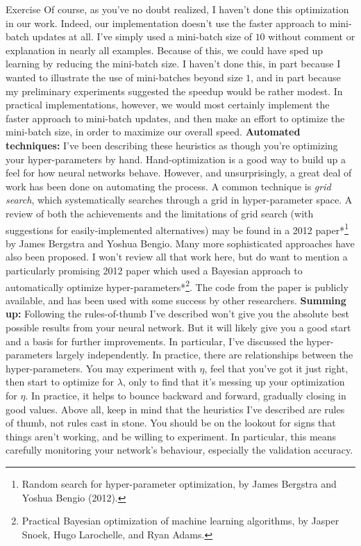 \begin{exerciseBox}{Exercise}
Of course, as you've no doubt realized, I haven't done this optimization in our work. Indeed, our implementation doesn't use the faster approach to mini-batch updates at all. I've simply used a mini-batch size of $10$ without comment or explanation in nearly all examples. Because of this, we could have sped up learning by reducing the mini-batch size. I haven't done this, in part because I wanted to illustrate the use of mini-batches beyond size $1$, and in part because my preliminary experiments suggested the speedup would be rather modest. In practical implementations, however, we would most certainly implement the faster approach to mini-batch updates, and then make an effort to optimize the mini-batch size, in order to maximize our overall speed. \textbf{Automated techniques:} I've been describing these heuristics as though you're optimizing your hyper-parameters by hand. Hand-optimization is a good way to build up a feel for how neural networks behave. However, and unsurprisingly, a great deal of work has been done on automating the process. A common technique is \emph{grid search}, which systematically searches through a grid in hyper-parameter space. A review of both the achievements and the limitations of grid search (with suggestions for easily-implemented alternatives) may be found in a 2012 paper*\footnote{Random search for hyper-parameter optimization, by James Bergstra and Yoshua Bengio (2012).} by James Bergstra and Yoshua Bengio. Many more sophisticated approaches have also been proposed. I won't review all that work here, but do want to mention a particularly promising 2012 paper which used a Bayesian approach to automatically optimize hyper-parameters*\footnote{Practical Bayesian optimization of machine learning algorithms, by Jasper Snoek, Hugo Larochelle, and Ryan Adams.}. The code from the paper is publicly available, and has been used with some success by other researchers. \textbf{Summing up:} Following the rules-of-thumb I've described won't give you the absolute best possible results from your neural network. But it will likely give you a good start and a basis for further improvements. In particular, I've discussed the hyper-parameters largely independently. In practice, there are relationships between the hyper-parameters. You may experiment with $\eta$, feel that you've got it just right, then start to optimize for $\lambda$, only to find that it's messing up your optimization for $\eta$. In practice, it helps to bounce backward and forward, gradually closing in good values. Above all, keep in mind that the heuristics I've described are rules of thumb, not rules cast in stone. You should be on the lookout for signs that things aren't working, and be willing to experiment. In particular, this means carefully monitoring your network's behaviour, especially the validation accuracy.



\end{exerciseBox}
